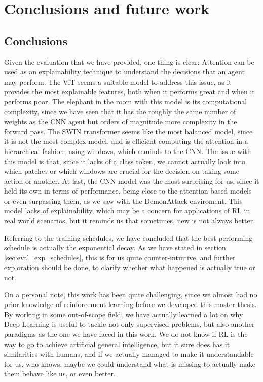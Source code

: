 \chapter{Conclusions and future work}
\label{cha:conclusions}

\section{Conclusions}
Given the evaluation that we have provided, one thing is clear: Attention can be used as an explainability technique to understand the decisions that an agent may perform. The ViT seems a suitable model to address this issue, as it provides the most explainable features, both when it performs great and when it performs poor. The elephant in the room with this model is its computational complexity, since we have seen that it has the roughly the same number of weights as the CNN agent but orders of magnitude more complexity in the forward pass. The SWIN transformer seems like the most balanced model, since it is not the most complex model, and is efficient computing the attention in a hierarchical fashion, using windows, which reminds to the CNN. The issue with this model is that, since it lacks of a class token, we cannot actually look into which patches or which windows are crucial for the decision on taking some action or another. At last, the CNN model was the most surprising for us, since it held its own in terms of performance, being close to the attention-based models or even surpassing them, as we saw with the DemonAttack enviroment. This model lacks of explainability, which may be a concern for applications of RL in real world scenarios, but it reminds us that sometimes, new is not always better.

Referring to the training schedules, we have concluded that the best performing schedule is actually the exponential decay. As we have stated in section \ref{sec:eval_exp_schedules}, this is for us quite counter-intuitive, and further exploration should be done, to clarify whether what happened is actually true or not.

On a personal note, this work has been quite challenging, since we almost had no prior knowledge of reinforcement learning before we developed this master thesis. By working in some out-of-scope field, we have actually learned a lot on why Deep Learning is useful to tackle not only supervised problems, but also another paradigms as the one we have faced in this work. We do not know if RL is the way to go to achieve artificial general intelligence, but it sure does has it similarities with humans, and if we actually managed to make it understandable for us, who knows, maybe we could understand what is missing to actually make them behave like us, or even better.

